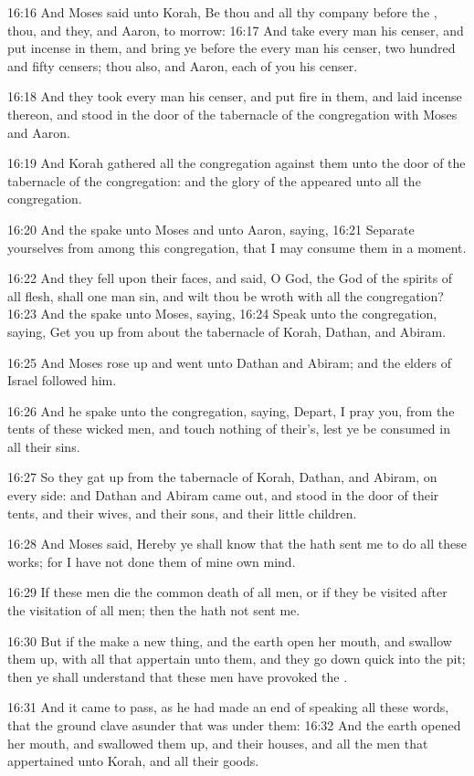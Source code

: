 16:16 And Moses said unto Korah, Be thou and all thy company before
the \LORD, thou, and they, and Aaron, to morrow: 16:17 And take every
man his censer, and put incense in them, and bring ye before the \LORD
every man his censer, two hundred and fifty censers; thou also, and
Aaron, each of you his censer.

16:18 And they took every man his censer, and put fire in them, and
laid incense thereon, and stood in the door of the tabernacle of the
congregation with Moses and Aaron.

16:19 And Korah gathered all the congregation against them unto the
door of the tabernacle of the congregation: and the glory of the \LORD
appeared unto all the congregation.

16:20 And the \LORD spake unto Moses and unto Aaron, saying, 16:21
Separate yourselves from among this congregation, that I may consume
them in a moment.

16:22 And they fell upon their faces, and said, O God, the God of the
spirits of all flesh, shall one man sin, and wilt thou be wroth with
all the congregation?  16:23 And the \LORD spake unto Moses, saying,
16:24 Speak unto the congregation, saying, Get you up from about the
tabernacle of Korah, Dathan, and Abiram.

16:25 And Moses rose up and went unto Dathan and Abiram; and the
elders of Israel followed him.

16:26 And he spake unto the congregation, saying, Depart, I pray you,
from the tents of these wicked men, and touch nothing of their's, lest
ye be consumed in all their sins.

16:27 So they gat up from the tabernacle of Korah, Dathan, and Abiram,
on every side: and Dathan and Abiram came out, and stood in the door
of their tents, and their wives, and their sons, and their little
children.

16:28 And Moses said, Hereby ye shall know that the \LORD hath sent me
to do all these works; for I have not done them of mine own mind.

16:29 If these men die the common death of all men, or if they be
visited after the visitation of all men; then the \LORD hath not sent
me.

16:30 But if the \LORD make a new thing, and the earth open her mouth,
and swallow them up, with all that appertain unto them, and they go
down quick into the pit; then ye shall understand that these men have
provoked the \LORD.

16:31 And it came to pass, as he had made an end of speaking all these
words, that the ground clave asunder that was under them: 16:32 And
the earth opened her mouth, and swallowed them up, and their houses,
and all the men that appertained unto Korah, and all their goods.

